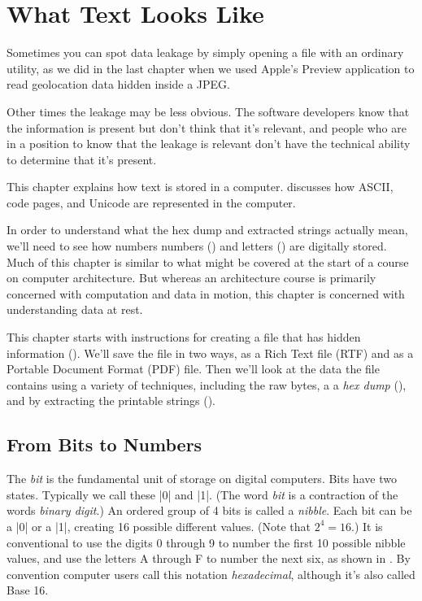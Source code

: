 \chapter{What Text Looks Like \INDEV}

Sometimes you can spot data leakage by simply opening a file with an
ordinary utility, as we did in the last chapter when we used Apple's
Preview application to read geolocation data hidden inside a JPEG. 

Other times the leakage may be less obvious.  The software developers
know that the information is present but don't think that it's
relevant, and people who are in a position to know that the leakage is
relevant don't have the technical ability to determine that it's
present.

This chapter explains how text is stored in a
computer.  discusses
how ASCII, code pages, and Unicode are represented in the computer. 

In order to understand what the hex dump and extracted strings
actually mean, we'll need to see how numbers 
numbers () and letters () are 
digitally stored.  Much of this chapter is similar to
what might be covered at the start of a course on computer
architecture. But whereas an architecture course is primarily
concerned with computation and data in motion, this chapter is
concerned with understanding data at rest.

This chapter starts with instructions for creating a file that has hidden information
(). We'll save the file in two ways, as a Rich
Text file (RTF) and as a Portable Document Format (PDF) file. Then
we'll look at the data the file contains using a variety of
techniques, including the raw bytes, a a \emph{hex dump}
(), and by extracting the printable strings
(). 


\section{From Bits to Numbers}\label{sec:numbers}
The \emph{bit} is the fundamental unit of storage on digital computers. Bits
have two states. Typically we call these |0| and |1|. (The word
\emph{bit} is a contraction of the words \emph{binary digit}.) 
An ordered group of 4 bits is called a \emph{nibble}. Each bit can be
a |0| or a |1|, creating 16 possible different values. (Note
that $2^4=16$.) It is conventional to use the digits 0 through 9 to
number the first 10 possible nibble values, and use the letters A
through F to number the next six, as shown in . By
convention computer users call this notation \emph{hexadecimal},
although it's also called Base 16.

